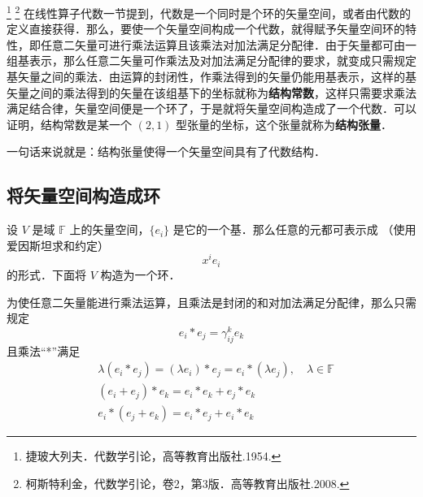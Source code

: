 
\footnote{捷玻大列夫．代数学引论，高等教育出版社.1954.}
\footnote{柯斯特利金，代数学引论，卷2，第3版．高等教育出版社.2008.} 在线性算子代数一节提到，代数是一个同时是个环的矢量空间，或者由代数的定义直接获得．那么，要使一个矢量空间构成一个代数，就得赋予矢量空间环的特性，即任意二矢量可进行乘法运算且该乘法对加法满足分配律．由于矢量都可由一组基表示，那么任意二矢量可作乘法及对加法满足分配律的要求，就变成只需规定基矢量之间的乘法．由运算的封闭性，作乘法得到的矢量仍能用基表示，这样的基矢量之间的乘法得到的矢量在该组基下的坐标就称为\textbf{结构常数}，这样只需要求乘法满足结合律，矢量空间便是一个环了，于是就将矢量空间构造成了一个代数．可以证明，结构常数是某一个 $(2,1)$ 型张量的坐标，这个张量就称为\textbf{结构张量}． 

一句话来说就是：结构张量使得一个矢量空间具有了代数结构．

\subsection{将矢量空间构造成环}
设 $V$ 是域 $\mathbb F$ 上的矢量空间，$\{e_i\}$ 是它的一个基．那么任意的元都可表示成 （使用爱因斯坦求和约定）
\begin{equation}
x^i e_i
\end{equation}
的形式．下面将 $V$ 构造为一个环．

为使任意二矢量能进行乘法运算，且乘法是封闭的和对加法满足分配律，那么只需规定
\begin{equation}\label{STAlg_eq1}
e_i*e_j=\gamma_{ij}^k e_k
\end{equation}
且乘法“*”满足
\begin{equation}
\begin{aligned}
&\lambda(e_i*e_j)=(\lambda e_i)*e_j=e_i*(\lambda e_j),\quad \lambda\in\mathbb F\\
&(e_i+e_j)*e_k=e_i*e_k+e_j*e_k\\
&e_i*(e_j+e_k)=e_i*e_j+e_i*e_k
\end{aligned}
\end{equation}


